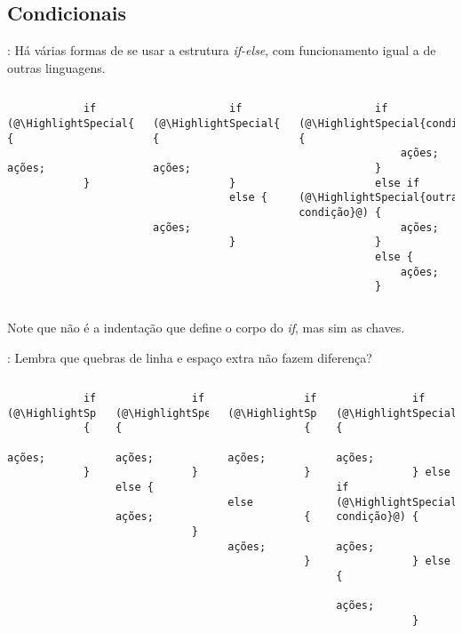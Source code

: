 \subsection{Condicionais}


\begin{frame}[fragile]{\insertsection: \insertsubsection}
	Há várias formas de se usar a estrutura \textit{if-else}, com funcionamento igual a de outras linguagens.
	\begin{columns}[t]
		\begin{verbatim}
			if (@\HighlightSpecial{condição}@) {
				ações;
			}
		\end{verbatim}

		\begin{verbatim}
			if (@\HighlightSpecial{condição}@) {
				ações;
			}
			else {
				ações;
			}
		\end{verbatim}

		\begin{verbatim}
			if (@\HighlightSpecial{condição}@) {
				ações;
			}
			else if (@\HighlightSpecial{outra condição}@) {
				ações;
			}
			else {
				ações;
			}
		\end{verbatim}
	\end{columns}
	Note que não é a indentação que define o corpo do \textit{if}, mas sim as chaves.
\end{frame}


\begin{frame}[fragile]{\insertsection: \insertsubsection}
	Lembra que quebras de linha e espaço extra não fazem diferença?
	\begin{columns}[t]
		\begin{verbatim}
			if (@\HighlightSpecial{condição}@)
			{
				ações;
			}
		\end{verbatim}

		\vspace{-\medskipamount}
		\begin{verbatim}
			if (@\HighlightSpecial{condição}@) {
				ações;
			} else {
				ações;
			}
		\end{verbatim}

		\begin{verbatim}
			if (@\HighlightSpecial{condição}@)
			{
				ações;
			}
			else
			{
				ações;
			}
		\end{verbatim}

		\begin{verbatim}
			if (@\HighlightSpecial{condição}@) {
				ações;
			} else if (@\HighlightSpecial{outra condição}@) {
				ações;
			} else {
				ações;
			}
		\end{verbatim}
	\end{columns}
\end{frame}


